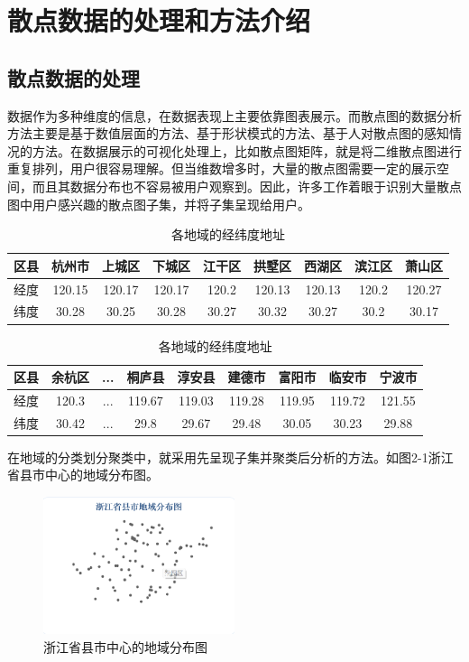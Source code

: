 \clearpage
\setcounter{equation}{0}
\section{散点数据的处理和方法介绍}
\subsection{散点数据的处理}
\par 数据作为多种维度的信息，在数据表现上主要依靠图表展示。而散点图的数据分析方法主要是基于数值层面的方法、基于形状模式的方法、基于人对散点图的感知情况的方法。在数据展示的可视化处理上，比如散点图矩阵，就是将二维散点图进行重复排列，用户很容易理解。但当维数增多时，大量的散点图需要一定的展示空间，而且其数据分布也不容易被用户观察到。因此，许多工作着眼于识别大量散点图中用户感兴趣的散点图子集，并将子集呈现给用户。
\begin{table}[!ht]
    \centering
        \caption{各地域的经纬度地址}
    \begin{tabular}{ccccccccc}
    \hline
       区县  &  杭州市 &	上城区	& 下城区 &	江干区 & 拱墅区 & 西湖区	& 滨江区	& 萧山区\\ \hline
       经度  &  120.15 &	120.17	& 120.17 &	120.2 & 120.13 & 120.13	& 120.2	& 120.27 \\ 
       纬度  & 30.28  &	30.25	& 30.28 &	30.27 & 30.32 & 30.27	& 30.2	& 30.17 \\ \hline
    \end{tabular}
    \label{tab:my_label}
\end{table}

\begin{table}[!ht]
    \centering
     \caption{各地域的经纬度地址}
    \begin{tabular}{ccccccccc}
    \hline
       区县  &  余杭区 &	...	& 桐庐县 &	淳安县 & 建德市 & 富阳市	& 临安市	& 宁波市\\ \hline
       经度  &  120.3 &	...	& 119.67 &	119.03 & 119.28 & 119.95	& 119.72	& 121.55 \\ 
       纬度  & 30.42  &	...	& 29.8 &	29.67 & 29.48 & 30.05	& 30.23	& 29.88 \\ \hline
    \end{tabular}
    \label{tab:my_label}
\end{table}

\par 在地域的分类划分聚类中，就采用先呈现子集并聚类后分析的方法。如图2-1浙江省县市中心的地域分布图。

\begin{figure}[!ht]
    \centering
     \includegraphics[width=0.5\textwidth]{fig2/fig21.png}
      \caption{浙江省县市中心的地域分布图}
\end{figure}
\FloatBarrier  %

